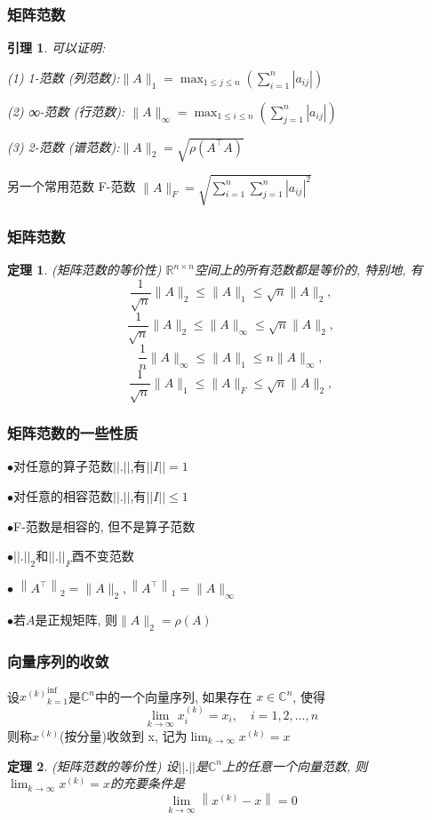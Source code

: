 \documentclass[notheorems,serif]{beamer}
\newcommand{\hei}[1]{{\HEI#1}}
\newtheorem{theorem}{\hei{定理}}
\newtheorem{lemma}{\hei{引理}}
\begin{document}
\begin{frame}
\frametitle{矩阵范数}
\begin{lemma}
	可以证明:
	
	(1) 1-范数 (列范数):$\|A\|_{1}=\max _{1 \leq j \leq n}\left(\sum_{i=1}^{n}\left|a_{i j}\right|\right)$
	
	(2) ∞-范数 (行范数): $\|A\|_{\infty}=\max _{1 \leq i \leq n}\left(\sum_{j=1}^{n}\left|a_{i j}\right|\right)$
	
	(3) 2-范数 (谱范数):$\|A\|_{2}=\sqrt{\rho\left(A^{\top} A\right)}$
	
\end{lemma}

另一个常用范数 F-范数 $\|A\|_{F}=\sqrt{\sum_{i=1}^{n} \sum_{j=1}^{n}\left|a_{i j}\right|^{2}}$
\end{frame}

\begin{frame}
\frametitle{矩阵范数}
\begin{theorem}(矩阵范数的等价性)
	$\mathbb{R}^{n×n}$空间上的所有范数都是等价的, 特别地, 有
	$$
	\frac{1}{\sqrt{n}}\|A\|_{2} \leq\|A\|_{1} \leq \sqrt{n}\|A\|_{2},
	$$
	$$
	\frac{1}{\sqrt{n}}\|A\|_{2} \leq\|A\|_{\infty} \leq \sqrt{n}\|A\|_{2},
	$$
	$$
	\frac{1}{n}\|A\|_{\infty} \leq\|A\|_{1} \leq n\|A\|_{\infty}
	,
	$$
	$$
	\frac{1}{\sqrt{n}}\|A\|_{1} \leq\|A\|_{F} \leq \sqrt{n}\|A\|_{2}
	,
	$$
\end{theorem}
\end{frame}

\begin{frame}
\frametitle{矩阵范数的一些性质}
$\bullet$对任意的算子范数$||.||$,有$||I|| = 1$

$\bullet$对任意的相容范数$||.||$,有$||I|| \leq 1$ 

$\bullet$F-范数是相容的, 但不是算子范数

$\bullet$$||.||_2$和$||.||_F$酉不变范数

$\bullet$ $\left\|A^{\top}\right\|_{2}=\|A\|_{2},\left\|A^{\top}\right\|_{1}=\|A\|_{\infty}$

$\bullet$若$A$是正规矩阵, 则$\|A\|_{2}=\rho(A)$
\end{frame}

\begin{frame}
\frametitle{向量序列的收敛}
设${x^{(k)}}^{\inf}_{
	k=1}$是$\mathbb{C}^n $中的一个向量序列, 如果存在 $x \in \mathbb{C}^n$, 使得
$$
\lim _{k \rightarrow \infty} x_{i}^{(k)}=x_{i}, \quad i=1,2, \ldots, n
$$
则称${x^{(k)}}$(按分量)收敛到 x, 记为$\lim _{k \rightarrow \infty} x^{(k)}=x$

\begin{theorem}(矩阵范数的等价性)
	设$||.||$是$\mathbb{C}^{n}$上的任意一个向量范数, 则$\lim _{k \rightarrow \infty} x^{(k)}=x$的充要条件是
	$$
	\lim _{k \rightarrow \infty}\left\|x^{(k)}-x\right\|=0
	$$
\end{theorem}
\end{frame}
\end{document}
